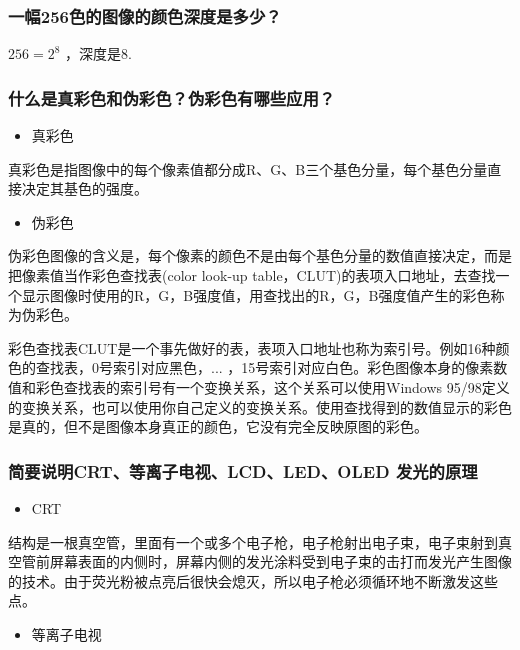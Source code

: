 \documentclass[UTF8,a4paper,AutoFakeBold,AutoFakeSlant]{ctexart}
\begin{document}
\subsubsection{一幅256色的图像的颜色深度是多少？}

$256 = 2^8$ ，深度是8.



\subsubsection{什么是真彩色和伪彩色？伪彩色有哪些应用？}

\begin{itemize}
  \item 真彩色
\end{itemize}

真彩色是指图像中的每个像素值都分成R、G、B三个基色分量，每个基色分量直接决定其基色的强度。

\begin{itemize}
  \item 伪彩色
\end{itemize}

伪彩色图像的含义是，每个像素的颜色不是由每个基色分量的数值直接决定，而是把像素值当作彩色查找表(color look-up table，CLUT)的表项入口地址，去查找一个显示图像时使用的R，G，B强度值，用查找出的R，G，B强度值产生的彩色称为伪彩色。

彩色查找表CLUT是一个事先做好的表，表项入口地址也称为索引号。例如16种颜色的查找表，0号索引对应黑色，... ，15号索引对应白色。彩色图像本身的像素数值和彩色查找表的索引号有一个变换关系，这个关系可以使用Windows 95/98定义的变换关系，也可以使用你自己定义的变换关系。使用查找得到的数值显示的彩色是真的，但不是图像本身真正的颜色，它没有完全反映原图的彩色。



\subsubsection{简要说明CRT、等离子电视、LCD、LED、OLED 发光的原理}

\begin{itemize}
  \item CRT
\end{itemize}

结构是一根真空管，里面有一个或多个电子枪，电子枪射出电子束，电子束射到真空管前屏幕表面的内侧时，屏幕内侧的发光涂料受到电子束的击打而发光产生图像的技术。由于荧光粉被点亮后很快会熄灭，所以电子枪必须循环地不断激发这些点。

\begin{itemize}
  \item 等离子电视
\end{itemize}
\end{document}
